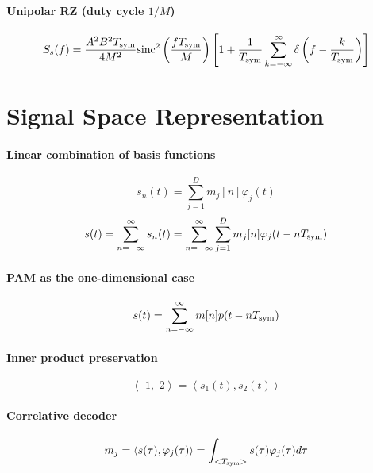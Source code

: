 \paragraph{Unipolar RZ (duty cycle $1/M$)}
\begin{equation}
S_s(f) = \frac{A^2 B^2 {T_{\textrm{sym}}}}{4 M^2} {\textrm{sinc}}^2 \left(\frac{f {T_{\textrm{sym}}}}{M} \right) \left[ 1 + \frac{1}{{T_{\textrm{sym}}}} \sum^{\infty}_{k=-\infty} \delta \left(f - \frac{k}{{T_{\textrm{sym}}}} \right) \right]
\label{eq:rzUnipolarPSD}
\end{equation}

\section*{Signal Space Representation}

\paragraph{Linear combination of basis functions}
\begin{equation}
s_n(t) = \sum_{j=1}^D m_j[n] \varphi_j(t)
\label{eq:signalComposedByLinearCombination}
\end{equation}
\begin{equation}
s(t) = \sum_{n=-\infty}^{\infty} s_n(t) = \sum_{n=-\infty}^{\infty} \sum_{j=1}^D m_j[n] \varphi_j(t - n {T_{\textrm{sym}}})
\label{eq:totalSignalComposedByLinearCombination}
\end{equation}

\paragraph{PAM as the one-dimensional case}
\begin{equation}
s(t) = \sum_{n=-\infty}^{\infty} m[n] p(t-n {T_{\textrm{sym}}})
\label{eq:pamEquation2}
\end{equation}

\paragraph{Inner product preservation}
\[
\left< \bm_1, \bm_2 \right> = \left< s_1(t), s_2(t) \right>
\]

\paragraph{Correlative decoder}
\begin{equation}
m_j = \left< s(\tau), \varphi_j(\tau) \right> = \int_{<{T_{\textrm{sym}}}>} s(\tau) \varphi_j(\tau) d\tau
\label{eq:correlativeDecoder}
\end{equation}

